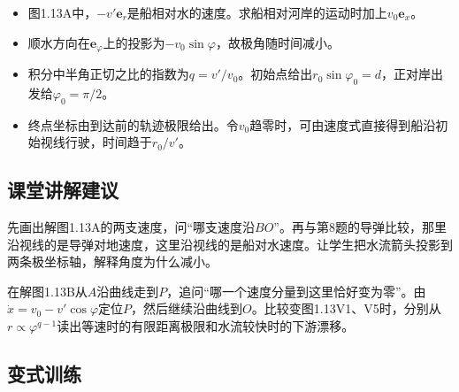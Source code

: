 \documentclass[UTF8,fontset=fandol,a4paper,11pt]{ctexart}
\newcommand{\vect}[1]{\bm{#1}}
\begin{document}
\begin{itemize}
\item 图1.13A中，$-v'\vect e_r$是船相对水的速度。求船相对河岸的运动时加上$v_0\vect e_x$。
\item 顺水方向在$\vect e_\varphi$上的投影为$-v_0\sin\varphi$，故极角随时间减小。
\item 积分中半角正切之比的指数为$q=v'/v_0$。初始点给出$r_0\sin\varphi_0=d$，正对岸出发给$\varphi_0=\pi/2$。
\item 终点坐标由到达前的轨迹极限给出。令$v_0$趋零时，可由速度式直接得到船沿初始视线行驶，时间趋于$r_0/v'$。
\end{itemize}



\subsection*{课堂讲解建议}

先画出解图1.13A的两支速度，问“哪支速度沿$BO$”。再与第8题的导弹比较，那里沿视线的是导弹对地速度，这里沿视线的是船对水速度。让学生把水流箭头投影到两条极坐标轴，解释角度为什么减小。

在解图1.13B从$A$沿曲线走到$P$，追问“哪一个速度分量到这里恰好变为零”。由$\dot x=v_0-v'\cos\varphi$定位$P$，然后继续沿曲线到$O$。比较变图1.13V1、V5时，分别从$r\propto\varphi^{q-1}$读出等速时的有限距离极限和水流较快时的下游漂移。



\subsection*{变式训练}
\end{document}
